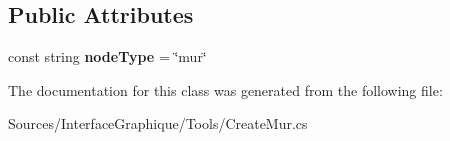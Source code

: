 \subsection*{Public Attributes}
\begin{DoxyCompactItemize}
\item 
\hypertarget{class_interface_graphique_1_1_tools_1_1_create_mur_a6a3194a95fe6d3ec0df213d94936da79}{}const string {\bfseries node\+Type} = \char`\"{}mur\char`\"{}\label{class_interface_graphique_1_1_tools_1_1_create_mur_a6a3194a95fe6d3ec0df213d94936da79}

\end{DoxyCompactItemize}


The documentation for this class was generated from the following file\+:\begin{DoxyCompactItemize}
\item 
Sources/\+Interface\+Graphique/\+Tools/Create\+Mur.\+cs\end{DoxyCompactItemize}

